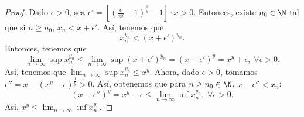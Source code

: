 \begin{proof}
	Dado $\displaystyle \epsilon > 0 $, sea $\displaystyle \epsilon ' = \left[\left(\frac{\epsilon }{x^{y}}+1\right)^{\frac{1}{y}}-1\right] \cdot x > 0 $. Entonces, existe $\displaystyle n_{0} \in \N $ tal que si $\displaystyle n \geq n_{0} $, $\displaystyle x_{n} < x + \epsilon ' $. Así, tenemos que 
\[x_{n}^{y_{n}} < \left(x + \epsilon'\right)^{y_{n}} .\]
Entonces, tenemos que 
\[\lim_{n \to \infty}\sup x_{n}^{y_{n}} \leq \lim_{n \to \infty}\sup\left(x+\epsilon'\right)^{y_{n}}=\left(x+\epsilon'\right)^{y} = x^{y}+\epsilon, \; \forall \epsilon > 0.\]
Así, tenemos que $\displaystyle \lim_{n \to \infty}\sup x_{n}^{y_{n}} \leq x^{y} $. Ahora, dado $\displaystyle \epsilon > 0 $, tomamos $\displaystyle \epsilon '' = x - \left(x^{y}-\epsilon \right)^{\frac{1}{y}} > 0 $. Así, obtenemos que para $\displaystyle n \geq n_{0}\in\N $, $\displaystyle x-\epsilon '' < x_{n} $:
\[\left(x - \epsilon ''\right)^{y} = x^{y}-\epsilon \leq \lim_{n \to \infty}\inf x_{n}^{y_{n}}, \; \forall \epsilon > 0 .\]
Así, $\displaystyle x^{y} \leq \lim_{n \to \infty}\inf x_{n}^{y_{n}} $.
\end{proof}
